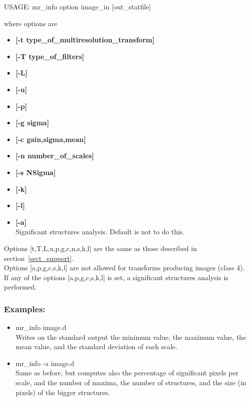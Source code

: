 {\bf 
\begin{center}
 USAGE: mr\_info option image\_in [out\_statfile]
\end{center}}
 where options are 
\begin{itemize}
\baselineskip=0.4truecm
\itemsep=0.1truecm
\item {\bf [-t type\_of\_multiresolution\_transform]} 
\item {\bf [-T type\_of\_filters]}  
\item {\bf [-L]} 
\item {\bf [-u]} 
\item {\bf [-p]} 
\item {\bf [-g sigma]} 
\item {\bf [-c gain,sigma,mean]} 
\item {\bf [-n number\_of\_scales]} 
\item {\bf [-s NSigma]} 
\item {\bf [-k]} 
\item {\bf [-l]}
\item {\bf [-a]} \\
Significant structures analysis. Default is not to do this.
\end{itemize}
Options [t,T,L,u,p,g,c,n,s,k,l] are the same as those described in 
section~\ref{sect_support}. \\
Options [a,p,g,c,s,k,l] are not
allowed for transforms producing images (class 4). \\
If any of
the options [a,p,g,c,s,k,l] is set, a significant structures
analysis is performed.
\subsubsection{Examples:}
\begin{itemize}
\item mr\_info image.d  \\
Writes on the standard output the minimum value, the maximum value,
the mean value, and the standard deviation of each scale.
\item mr\_info -a  image.d \\
Same as before, but computes also the percentage of significant
pixels per scale, and the number of maxima, the number of
structures, and the size (in pixels) of the bigger structures.
\end{itemize}

